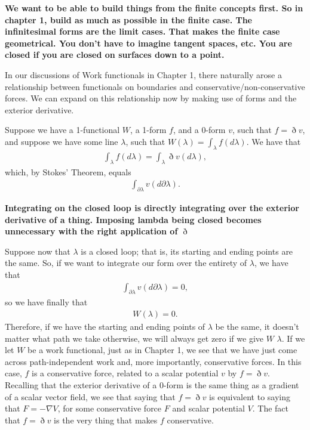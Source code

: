 \documentclass{book}
\begin{document}
\textbf{We want to be able to build things from the finite concepts first. So in chapter 1, build as much as possible in the finite case. The infinitesimal forms are the limit cases. That makes the finite case geometrical. You don't have to imagine tangent spaces, etc. You are closed if you are closed on surfaces down to a point.}

In our discussions of Work functionals in Chapter 1, there naturally arose a relationship between functionals on boundaries and conservative/non-conservative forces. We can expand on this relationship now by making use of forms and the exterior derivative. 

Suppose we have a 1-functional $W$, a 1-form $f$, and a 0-form $v$, such that $f = \eth v$, and suppose we have some line $\lambda$, such that $W(\lambda) = \int_\lambda f(d\lambda)$. We have that \begin{gather}\int_\lambda f(d\lambda) = \int_\lambda \eth v(d\lambda),\end{gather} which, by Stokes' Theorem, equals \begin{gather} \int_{\partial\lambda} v(d\partial\lambda).\end{gather}

\textbf{Integrating on the closed loop is directly integrating over the exterior derivative of a thing. Imposing lambda being closed becomes unnecessary with the right application of $\eth$}

Suppose now that $\lambda$ is a closed loop; that is, its starting and ending points are the same. So, if we want to integrate our form over the entirety of $\lambda$, we have that \begin{gather} \int_{\partial\lambda} v(d\partial\lambda) = 0,\end{gather} so we have finally that \begin{gather} W(\lambda) = 0.\end{gather} Therefore, if we have the starting and ending points of $\lambda$ be the same, it doesn't matter what path we take otherwise, we will always get zero if we give $W$ $\lambda$. If we let $W$ be a work functional, just as in Chapter 1, we see that we have just come across path-independent work and, more importantly, conservative forces. In this case, $f$ is a conservative force, related to a scalar potential $v$ by $f = \eth v$. Recalling that the exterior derivative of a 0-form is the same thing as a gradient of a scalar vector field, we see that saying that $f = \eth v$ is equivalent to saying that $F = -\nabla V$, for some conservative force $F$ and scalar potential $V$. The fact that $f = \eth v$ is the very thing that makes $f$ conservative.  
\end{document}
